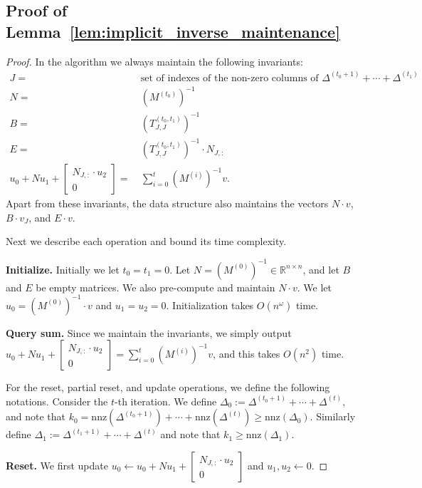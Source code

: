 \documentclass[11pt]{article}
\newcommand{\nnz}{\mathrm{nnz}}
\newcommand\uu{\boldsymbol{\mathit{u}}}
\newcommand\vv{\boldsymbol{\mathit{v}}}
\newcommand\BB{\boldsymbol{\mathit{B}}}
\newcommand\EE{\boldsymbol{\mathit{E}}}
\newcommand\NN{\boldsymbol{\mathit{N}}}
\newcommand\MM{\boldsymbol{\mathit{M}}}
\newcommand\TT{\boldsymbol{\mathit{T}}}
\newcommand\R{\mathbb{R}}
\begin{document}
\subsection*{Proof of Lemma~\ref{lem:implicit_inverse_maintenance}}
\begin{proof}
In the algorithm we always maintain the following invariants:
\begin{align*}
J = &~ \text{set of indexes of the non-zero columns of } \Delta^{(t_0+1)} + \cdots + \Delta^{(t_1)} \\
\NN = &~ (\MM^{(t_0)})^{-1}  \\
\BB = &~ (\TT^{(t_0,t_1)}_{J,J})^{-1} \\
\EE = &~ (\TT^{(t_0,t_1)}_{J,J})^{-1} \cdot \NN_{J,:} \\
\uu_0 + \NN \uu_1 + \begin{bmatrix}
\NN_{J,:} \cdot \uu_2 \\ 0
\end{bmatrix} = &~ \sum_{i=0}^t (\MM^{(i)})^{-1} \vv.
\end{align*}
Apart from these invariants, the data structure also maintains the vectors $\NN \cdot \vv$, $\BB \cdot \vv_{J}$, and $\EE \cdot \vv$.

Next we describe each operation and bound its time complexity.

{\bf Initialize.} Initially we let $t_0 = t_1 = 0$. Let $\NN = (\MM^{(0)})^{-1} \in \R^{n \times n}$, and let $\BB$ and $\EE$ be empty matrices. We also pre-compute and maintain $\NN \cdot \vv$. We let $\uu_0 = (\MM^{(0)})^{-1} \cdot \vv$ and $\uu_1 = \uu_2 = 0$. Initialization takes $O(n^{\omega})$ time.

{\bf Query sum.} Since we maintain the invariants, we simply output $\uu_0 + \NN \uu_1 + \begin{bmatrix}
\NN_{J,:} \cdot \uu_2 \\ 0
\end{bmatrix} = \sum_{i=0}^t (\MM^{(i)})^{-1} \vv$, and this takes $O(n^2)$ time.

For the reset, partial reset, and update operations, we define the following notations. Consider the $t$-th iteration. We define $\Delta_0 := \Delta^{(t_0+1)} + \cdots + \Delta^{(t)}$, and note that $k_0 = \nnz(\Delta^{(t_0+1)}) + \cdots + \nnz(\Delta^{(t)}) \geq \nnz(\Delta_0)$. Similarly define $\Delta_1 := \Delta^{(t_1+1)} + \cdots + \Delta^{(t)}$ and note that $k_1 \geq \nnz(\Delta_1)$.

{\bf Reset.} We first update $\uu_0 \gets \uu_0 + \NN \uu_1 + \begin{bmatrix}
\NN_{J,:} \cdot \uu_2 \\ 0
\end{bmatrix}$ and $\uu_1, \uu_2 \gets 0$. 


\end{proof}
\end{document}
